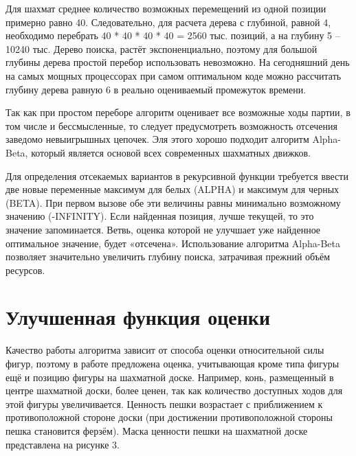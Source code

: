 \documentclass[a4paper,10pt,twoside]{article}
\begin{document}
\begin{multicols}{2}

Для шахмат среднее количество возможных перемещений из одной позиции примерно равно 40. Следовательно, для расчета дерева с глубиной, равной 4, необходимо перебрать 40 * 40 * 40 * 40 = 2560 тыс. позиций, а на глубину 5 -- 10240 тыс. Дерево поиска, растёт экспоненциально, поэтому для большой глубины дерева простой перебор использовать невозможно. На сегодняшний день на самых мощных процессорах при самом оптимальном коде можно рассчитать глубину дерева равную 6 в реально оцениваемый промежуток времени.

Так как при простом переборе алгоритм оценивает все возможные ходы партии, в том числе и бессмысленные, то следует предусмотреть возможность отсечения заведомо невыигрышных цепочек. Эля этого хорошо подходит алгоритм Alpha-Beta, который является основой всех современных шахматных движков.

Для определения отсекаемых вариантов в рекурсивной функции требуется ввести две новые переменные максимум для белых (ALPHA) и максимум для черных (BETA). При первом вызове обе эти величины равны минимально возможному значению (-INFINITY). Если найденная позиция, лучше текущей, то это значение запоминается. Ветвь, оценка которой не улучшает уже найденное оптимальное значение, будет «отсечена». Использование алгоритма Alpha-Beta позволяет значительно увеличить глубину поиска, затрачивая прежний объём ресурсов.



\section{Улучшенная функция оценки}
Качество работы алгоритма зависит от способа оценки относительной силы фигур, поэтому в работе предложена оценка, учитывающая кроме типа фигуры ещё и позицию фигуры на шахматной доске. Например, конь, размещенный в центре шахматной доски, более ценен, так как количество доступных ходов для этой фигуры увеличивается. Ценность пешки возрастает с приближением к противоположной стороне доски (при достижении противоположной стороны пешка становится ферзём). Маска ценности пешки на шахматной доске представлена на рисунке 3.


\end{multicols}
\end{document}
